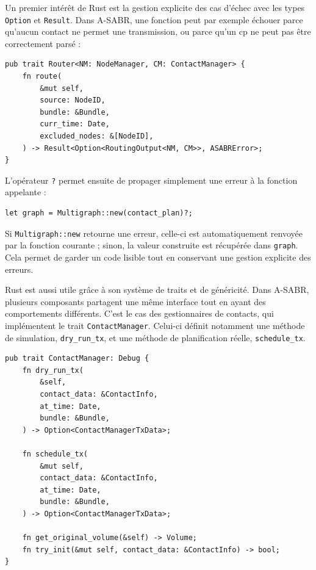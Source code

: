 \documentclass{article}
\begin{document}
Un premier intérêt de Rust est la gestion explicite des cas d'échec avec les types \texttt{Option} et \texttt{Result}. Dans A-SABR, une fonction peut par exemple échouer parce qu'aucun contact ne permet une transmission, ou parce qu'un \gls{cp} ne peut pas être correctement parsé :

\begin{verbatim}
pub trait Router<NM: NodeManager, CM: ContactManager> {
    fn route(
        &mut self,
        source: NodeID,
        bundle: &Bundle,
        curr_time: Date,
        excluded_nodes: &[NodeID],
    ) -> Result<Option<RoutingOutput<NM, CM>>, ASABRError>;
}
\end{verbatim}

L'opérateur \texttt{?} permet ensuite de propager simplement une erreur à la fonction appelante :

\begin{verbatim}
let graph = Multigraph::new(contact_plan)?;
\end{verbatim}

Si \texttt{Multigraph::new} retourne une erreur, celle-ci est automatiquement renvoyée par la fonction courante ; sinon, la valeur construite est récupérée dans \texttt{graph}. Cela permet de garder un code lisible tout en conservant une gestion explicite des erreurs.

Rust est aussi utile grâce à son système de traits et de généricité. Dans A-SABR, plusieurs composants partagent une même interface tout en ayant des comportements différents. C'est le cas des gestionnaires de contacts, qui implémentent le trait \texttt{ContactManager}. Celui-ci définit notamment une méthode de simulation, \texttt{dry\_run\_tx}, et une méthode de planification réelle, \texttt{schedule\_tx}.

\begin{verbatim}
pub trait ContactManager: Debug {
    fn dry_run_tx(
        &self,
        contact_data: &ContactInfo,
        at_time: Date,
        bundle: &Bundle,
    ) -> Option<ContactManagerTxData>;

    fn schedule_tx(
        &mut self,
        contact_data: &ContactInfo,
        at_time: Date,
        bundle: &Bundle,
    ) -> Option<ContactManagerTxData>;

    fn get_original_volume(&self) -> Volume;
    fn try_init(&mut self, contact_data: &ContactInfo) -> bool;
}
\end{verbatim}
\end{document}
